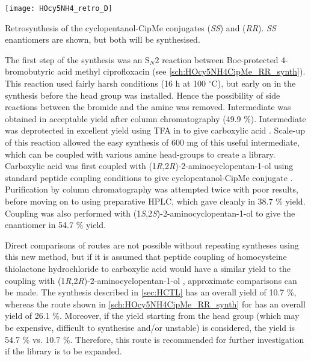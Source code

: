 \begin{scheme}[H]
	\begin{center}
		\texttt{[image: HOcy5NH4\_retro\_D]}
		\caption{Retrosynthesis of the cyclopentanol-CipMe conjugates   (\textit{SS}) and  (\textit{RR}). \textit{SS} enantiomers are shown, but both will be synthesised.\label{sch:HOcy5NH4_retro_D}}
	\end{center}
\end{scheme}

The first step of the synthesis was an S$_N$2 reaction between Boc-protected 4-bromobutyric acid  methyl ciprofloxacin  (see \ref{sch:HOcy5NH4CipMe_RR_synth}). This reaction used fairly harsh conditions (16 h at 100 $^{\circ}$C), but early on in the synthesis before the head group was installed. Hence the possibility of side reactions between the bromide and the amine was removed. Intermediate  was obtained in acceptable yield after column chromatography (49.9 \%).
Intermediate  was deprotected in excellent yield using TFA in  to give carboxylic acid . Scale-up of this reaction allowed the easy synthesis of 600 mg of this useful intermediate, which can be coupled with various amine head-groups to create a library.
Carboxylic acid  was first coupled with (1\textit{R},2\textit{R})-2-aminocyclopentan-1-ol  using standard peptide coupling conditions to give cyclopentanol-CipMe conjugate . Purification by column chromatography was attempted twice with poor results, before moving on to using preparative HPLC, which gave  cleanly in 38.7 \% yield.
Coupling was also performed with (1\textit{S},2\textit{S})-2-aminocyclopentan-1-ol  to give the enantiomer  in 54.7 \% yield.

Direct comparisons of routes are not possible without repeating syntheses using this new method, but if it is assumed that peptide coupling of homocysteine thiolactone hydrochloride  to carboxylic acid  would have a similar yield to the coupling with (1\textit{R},2\textit{R})-2-aminocyclopentan-1-ol , approximate comparisons can be made.
The synthesis described in \ref{sec:HCTL} has an overall yield of 10.7 \%, whereas the route shown in \ref{sch:HOcy5NH4CipMe_RR_synth} for  has an overall yield of 26.1 \%. Moreover, if the yield starting from the head group (which may be expensive, difficult to synthesise and/or unstable) is considered, the yield is 54.7 \% vs. 10.7 \%.
Therefore, this route is recommended for further investigation if the library is to be expanded.

